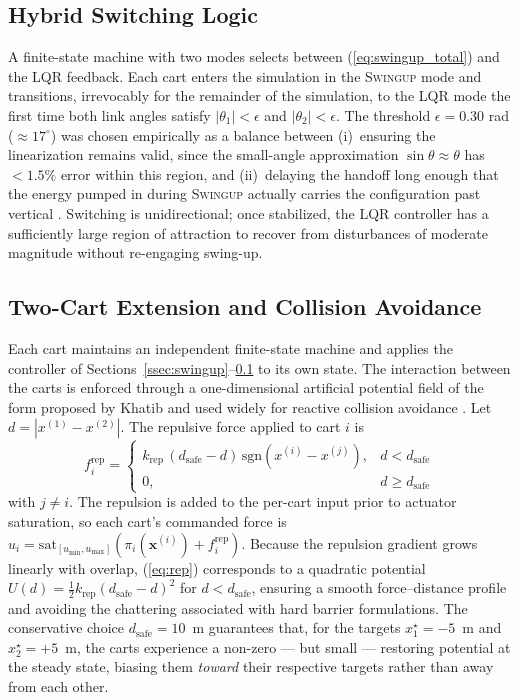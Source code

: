 \documentclass[conference]{IEEEtran}
\begin{document}
\subsection{Hybrid Switching Logic}\label{ssec:switching}
A finite-state machine with two modes selects between (\ref{eq:swingup_total}) and the LQR feedback. Each cart enters the simulation in the \textsc{Swingup} mode and transitions, irrevocably for the remainder of the simulation, to the \textsc{LQR} mode the first time both link angles satisfy $|\theta_1|<\epsilon$ and $|\theta_2|<\epsilon$. The threshold $\epsilon=0.30$ rad ($\approx17^\circ$) was chosen empirically as a balance between (i)~ensuring the linearization remains valid, since the small-angle approximation $\sin\theta\approx\theta$ has $<\!1.5\%$ error within this region, and (ii)~delaying the handoff long enough that the energy pumped in during \textsc{Swingup} actually carries the configuration past vertical \cite{lozano2000stabilization}. Switching is unidirectional; once stabilized, the LQR controller has a sufficiently large region of attraction to recover from disturbances of moderate magnitude without re-engaging swing-up.

\subsection{Two-Cart Extension and Collision Avoidance}\label{ssec:multi}
Each cart maintains an independent finite-state machine and applies the controller of Sections~\ref{ssec:swingup}--\ref{ssec:switching} to its own state. The interaction between the carts is enforced through a one-dimensional artificial potential field of the form proposed by Khatib \cite{khatib1986rtoa} and used widely for reactive collision avoidance \cite{lavalle2006planning}. Let $d=|x^{(1)}-x^{(2)}|$. The repulsive force applied to cart $i$ is
\begin{equation}
f_i^{\text{rep}} = \begin{cases}
k_{\text{rep}}\,(d_{\text{safe}}-d)\,\mathrm{sgn}(x^{(i)}-x^{(j)}), & d<d_{\text{safe}}\\
0, & d\ge d_{\text{safe}}
\end{cases}
\label{eq:rep}
\end{equation}
with $j\ne i$. The repulsion is added to the per-cart input prior to actuator saturation, so each cart's commanded force is $u_i=\mathrm{sat}_{[u_{\min},u_{\max}]}\!\left(\pi_i(\mathbf{x}^{(i)})+f_i^{\text{rep}}\right)$. Because the repulsion gradient grows linearly with overlap, (\ref{eq:rep}) corresponds to a quadratic potential $U(d)=\tfrac{1}{2}k_{\text{rep}}(d_{\text{safe}}-d)^2$ for $d<d_{\text{safe}}$, ensuring a smooth force--distance profile and avoiding the chattering associated with hard barrier formulations. The conservative choice $d_{\text{safe}}=10$~m guarantees that, for the targets $x^\star_1=-5$~m and $x^\star_2=+5$~m, the carts experience a non-zero --- but small --- restoring potential at the steady state, biasing them \emph{toward} their respective targets rather than away from each other.
\end{document}
